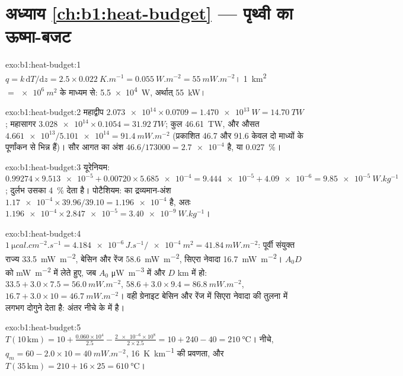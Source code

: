 \section*{अध्याय \ref{ch:b1:heat-budget} --- पृथ्वी का ऊष्मा-बजट}

\begin{solution}{exo:b1:heat-budget:1}
$q = k\,\mathrm dT/\mathrm dz = 2.5\times\qty{0.022}{K.m^{-1}} =
\qty{0.055}{W.m^{-2}} = \qty{55}{mW.m^{-2}}$। \qty{1}{km^2} $=
\qty{e6}{m^2}$ के माध्यम से: \qty{5.5e4}{W}, अर्थात् \qty{55}{kW}।
\end{solution}

\begin{solution}{exo:b1:heat-budget:2}
महाद्वीप $\num{2.073e14}\times0.0709 = \qty{1.470e13}{W} = \qty{14.70}{TW}$;
महासागर $\num{3.028e14}\times0.1054 = \qty{31.92}{TW}$; कुल \qty{46.61}{TW}, और
औसत  $\num{4.661e13}/\num{5.101e14} = \qty{91.4}{mW.m^{-2}}$ (प्रकाशित
46.7 और 91.6 केवल दो माध्यों के पूर्णांकन से भिन्न हैं)। सौर आगत का अंश $46.6/173000 = \num{2.7e-4}$ है, या
\qty{0.027}{\percent}।
\end{solution}

\begin{solution}{exo:b1:heat-budget:3}
यूरेनियम: $0.99274\times\num{9.513e-5} + 0.00720\times\num{5.685e-4} =
\num{9.444e-5} + \num{4.09e-6} = \qty{9.85e-5}{W.kg^{-1}}$; दुर्लभ
 उसका \qty{4}{\percent} देता है। पोटैशियम:  का द्रव्यमान-अंश
$\num{1.17e-4}\times39.96/39.10 = \num{1.196e-4}$ है, अतः
$\num{1.196e-4}\times\num{2.847e-5} = \qty{3.40e-9}{W.kg^{-1}}$।
\end{solution}

\begin{solution}{exo:b1:heat-budget:4}
$\qty{1}{\micro cal.cm^{-2}.s^{-1}} = \num{4.184e-6}\,\unit{J.s^{-1}}/\qty{e-4}{m^2}
= \qty{41.84}{mW.m^{-2}}$: पूर्वी संयुक्त राज्य \qty{33.5}{mW.m^{-2}}, बेसिन और
रेंज \qty{58.6}{mW.m^{-2}}, सिएरा नेवादा \qty{16.7}{mW.m^{-2}}। $A_0D$ को \unit{mW.m^{-2}} में लेते हुए, जब $A_0$
\unit{\micro W.m^{-3}} में और $D$ \unit{km} में हो:
$33.5 + 3.0\times7.5 = \qty{56.0}{mW.m^{-2}}$, $58.6 + 3.0\times9.4 =
\qty{86.8}{mW.m^{-2}}$, $16.7 + 3.0\times10 = \qty{46.7}{mW.m^{-2}}$। वही ग्रेनाइट
बेसिन और रेंज में सिएरा नेवादा की तुलना में लगभग दोगुने  देता है: अंतर नीचे के  में है।
\end{solution}

\begin{solution}{exo:b1:heat-budget:5}
$T(10\,\text{km}) = 10 + \frac{0.060\times10^4}{2.5} - \frac{\num{2e-6}\times10^8}{2\times2.5}
= 10 + 240 - 40 = \qty{210}{\degreeCelsius}$। नीचे, $q_m = 60 - 2.0\times10 =
\qty{40}{mW.m^{-2}}$, \qty{16}{K.km^{-1}} की प्रवणता, और
$T(35\,\text{km}) = 210 + 16\times25 = \qty{610}{\degreeCelsius}$।
\end{solution}

